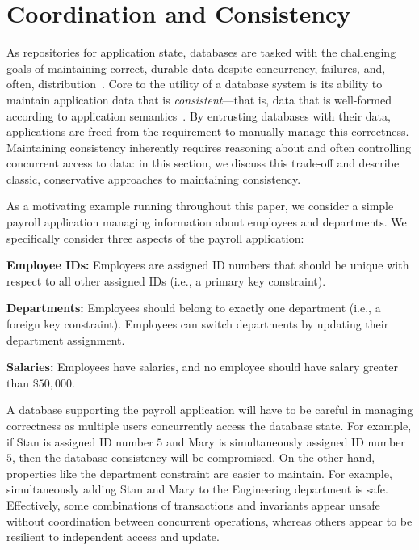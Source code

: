 
\section{Coordination and Consistency}
\label{sec:motivation}


As repositories for application state, databases are tasked with the
challenging goals of maintaining correct, durable data despite
concurrency, failures, and, often,
distribution~\cite{bernstein-book}. Core to the utility of a database
system is its ability to maintain application data that is
\textit{consistent}---that is, data that is well-formed according to
application semantics~\cite{gray-virtues}. By entrusting databases
with their data, applications are freed from the requirement to
manually manage this correctness. Maintaining consistency inherently
requires reasoning about and often controlling concurrent access to
data: in this section, we discuss this trade-off and describe classic,
conservative approaches to maintaining consistency.

 As a motivating example running throughout
this paper, we consider a simple payroll application managing
information about employees and departments. We specifically consider
three aspects of the payroll application:
\begin{myitemize}
\item\textbf{Employee IDs:} Employees are assigned ID numbers that
  should be unique with respect to all other assigned IDs (i.e., a
  primary key constraint).
\item\textbf{Departments:} Employees should belong to exactly one
  department (i.e., a foreign key constraint). Employees can switch
  departments by updating their department assignment.
\item\textbf{Salaries:} Employees have salaries, and no employee
  should have salary greater than $\$50,000$.
\end{myitemize}
A database supporting the payroll application will have to be careful
in managing correctness as multiple users concurrently access the
database state. For example, if Stan is assigned ID number $5$ and
Mary is simultaneously assigned ID number $5$, then the database
consistency will be compromised. On the other hand, properties like
the department constraint are easier to maintain. For example,
simultaneously adding Stan and Mary to the Engineering department is
safe. Effectively, some combinations of transactions and invariants
appear unsafe without coordination between concurrent operations,
whereas others appear to be resilient to independent access and
update.

